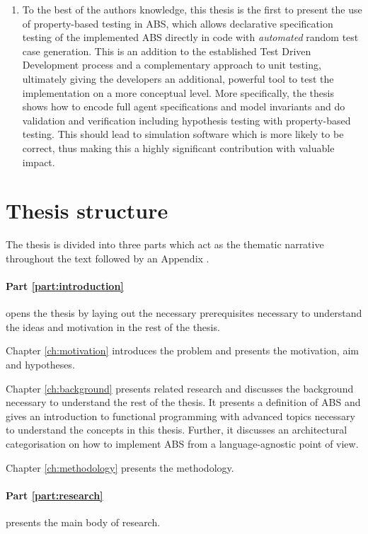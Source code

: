 \begin{enumerate}
	\item To the best of the authors knowledge, this thesis is the first to present the use of property-based testing in ABS, which allows declarative specification testing of the implemented ABS directly in code with \textit{automated} random test case generation. This is an addition to the established Test Driven Development process and a complementary approach to unit testing, ultimately giving the developers an additional, powerful tool to test the implementation on a more conceptual level. More specifically, the thesis shows how to encode full agent specifications and model invariants and do validation and verification including hypothesis testing with property-based testing. This should lead to simulation software which is more likely to be correct, thus making this a highly significant contribution with valuable impact.
\end{enumerate}

\section{Thesis structure}
The thesis is divided into three parts which act as the thematic narrative throughout the text followed by an Appendix . 

\paragraph{Part \ref{part:introduction}} opens the thesis by laying out the necessary prerequisites necessary to understand the ideas and motivation in the rest of the thesis.
\medskip

Chapter \ref{ch:motivation} introduces the problem and presents the motivation, aim and hypotheses.

\medskip

Chapter \ref{ch:background} presents related research and discusses the background necessary to understand the rest of the thesis. It presents a definition of ABS and gives an introduction to functional programming with advanced topics necessary to understand the concepts in this thesis. Further, it discusses an architectural categorisation on how to implement ABS from a language-agnostic point of view.

\medskip

Chapter \ref{ch:methodology} presents the methodology.

\medskip

\paragraph{Part \ref{part:research}} presents the main body of research.

